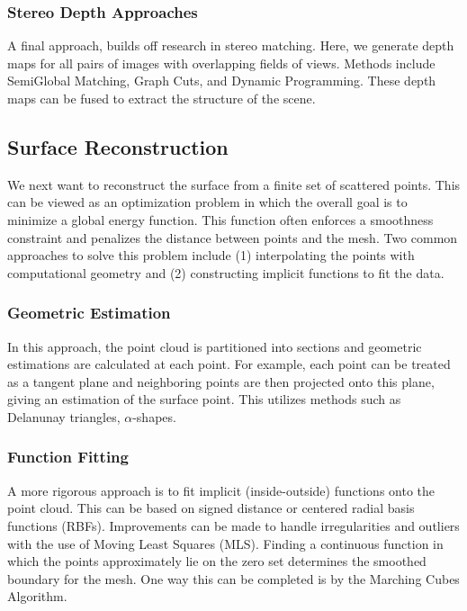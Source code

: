 \documentclass[10pt,twocolumn,letterpaper]{article}
\begin{document}
\subsubsection{Stereo Depth Approaches}

A final approach, builds off research in stereo matching. Here, we generate depth maps for all pairs of images with overlapping fields of views. Methods include SemiGlobal Matching, Graph Cuts, and Dynamic Programming.\cite{sgm,taxonomy} These depth maps can be fused to extract the structure of the scene.\cite{fuse}


\subsection{Surface Reconstruction}
We next want to reconstruct the surface from a finite set of scattered points.  This can be viewed as an optimization problem in which the overall goal is to minimize a global energy function. This function often enforces a smoothness constraint and penalizes the distance between points and the mesh.\cite{mesh_opt}  Two common approaches to solve this problem include (1) interpolating the points with computational geometry and (2) constructing implicit functions to fit the data.

\subsubsection{ Geometric Estimation }
In this approach, the point cloud is partitioned into sections and geometric estimations are calculated at each point. For example, each point can be treated as a tangent plane and neighboring points are then projected onto this plane, giving an estimation of the surface point.\cite{surface_review, hoppe1992surface}  This utilizes methods such as Delanunay triangles, $\alpha$-shapes. \cite{surface_review, poisson} 

\subsubsection{ Function Fitting}
A more rigorous approach is to fit implicit (inside-outside) functions onto the point cloud.  This can be based on signed distance or centered radial basis functions (RBFs).\cite{poisson}  Improvements can be made to handle irregularities and outliers with the use of Moving Least Squares (MLS).\cite{szeliski2010computer}  Finding a continuous function in which the points approximately lie on the zero set determines the smoothed boundary for the mesh.  One way this can be completed is by the Marching Cubes Algorithm.\cite{hoppe1992surface}
\end{document}

